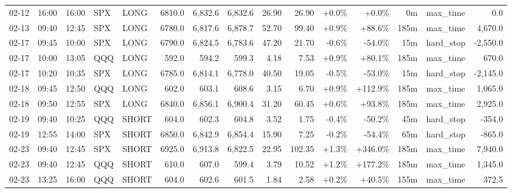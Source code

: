 \documentclass[11pt,a4paper,twoside]{article}
\begin{document}
\begin{landscape}
\begin{center}
\begin{longtable}{>{\color{txtmain}}l l l l l r r r r r r r r >{\color{txtmain}}l r}
02-12 & 16:00 & 16:00 & SPX & LONG & 6810.0 & 6,832.6 & 6,832.6 & 26.90 & 26.90 & \textcolor{wingreen}{+0.0\%} & \textcolor{wingreen}{+0.0\%} & 0m & max\_time & \textcolor{wingreen}{0.0} \\
02-13 & 09:40 & 12:45 & SPX & LONG & 6780.0 & 6,817.6 & 6,878.7 & 52.70 & 99.40 & \textcolor{wingreen}{+0.9\%} & \textcolor{wingreen}{+88.6\%} & 185m & max\_time & \textcolor{wingreen}{4,670.0} \\
02-17 & 09:45 & 10:00 & SPX & LONG & 6790.0 & 6,824.5 & 6,783.6 & 47.20 & 21.70 & \textcolor{lossred}{-0.6\%} & \textcolor{lossred}{-54.0\%} & 15m & hard\_stop & \textcolor{lossred}{-2,550.0} \\
02-17 & 10:00 & 13:05 & QQQ & LONG & 592.0 & 594.2 & 599.3 & 4.18 & 7.53 & \textcolor{wingreen}{+0.9\%} & \textcolor{wingreen}{+80.1\%} & 185m & max\_time & \textcolor{wingreen}{670.0} \\
02-17 & 10:20 & 10:35 & SPX & LONG & 6785.0 & 6,814.1 & 6,778.0 & 40.50 & 19.05 & \textcolor{lossred}{-0.5\%} & \textcolor{lossred}{-53.0\%} & 15m & hard\_stop & \textcolor{lossred}{-2,145.0} \\
02-18 & 09:45 & 12:50 & QQQ & LONG & 602.0 & 603.1 & 608.6 & 3.15 & 6.70 & \textcolor{wingreen}{+0.9\%} & \textcolor{wingreen}{+112.9\%} & 185m & max\_time & \textcolor{wingreen}{1,065.0} \\
02-18 & 09:50 & 12:55 & SPX & LONG & 6840.0 & 6,856.1 & 6,900.4 & 31.20 & 60.45 & \textcolor{wingreen}{+0.6\%} & \textcolor{wingreen}{+93.8\%} & 185m & max\_time & \textcolor{wingreen}{2,925.0} \\
02-19 & 09:40 & 10:25 & QQQ & SHORT & 604.0 & 602.3 & 604.8 & 3.52 & 1.75 & \textcolor{lossred}{-0.4\%} & \textcolor{lossred}{-50.2\%} & 45m & hard\_stop & \textcolor{lossred}{-354.0} \\
02-19 & 12:55 & 14:00 & SPX & SHORT & 6850.0 & 6,842.9 & 6,854.4 & 15.90 & 7.25 & \textcolor{lossred}{-0.2\%} & \textcolor{lossred}{-54.4\%} & 65m & hard\_stop & \textcolor{lossred}{-865.0} \\
02-23 & 09:40 & 12:45 & SPX & SHORT & 6925.0 & 6,913.8 & 6,822.5 & 22.95 & 102.35 & \textcolor{wingreen}{+1.3\%} & \textcolor{wingreen}{+346.0\%} & 185m & max\_time & \textcolor{wingreen}{7,940.0} \\
02-23 & 09:40 & 12:45 & QQQ & SHORT & 610.0 & 607.0 & 599.4 & 3.79 & 10.52 & \textcolor{wingreen}{+1.2\%} & \textcolor{wingreen}{+177.2\%} & 185m & max\_time & \textcolor{wingreen}{1,345.0} \\
02-23 & 13:25 & 16:00 & QQQ & SHORT & 604.0 & 602.6 & 601.5 & 1.84 & 2.58 & \textcolor{wingreen}{+0.2\%} & \textcolor{wingreen}{+40.5\%} & 155m & max\_time & \textcolor{wingreen}{372.5} \\

\end{longtable}
\end{center}
\end{landscape}
\end{document}
